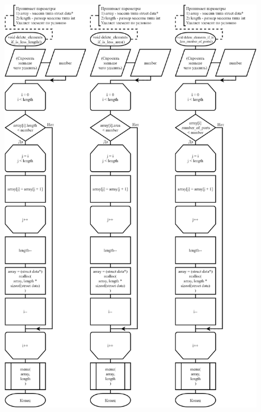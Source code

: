 \begin{figure}[!htp]
    \includegraphics[height=24cm]{../../Makefile-project/src/submenu/delete_by_condition/delete_by_condition-2.png}
\end{figure}
